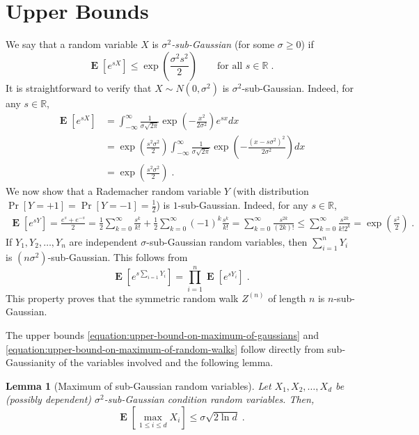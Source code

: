 \documentclass{article}
\DeclareMathOperator*{\Exp}{\mathbf{E}}
\newcommand{\field}[1]{\mathbb{#1}}
\newcommand{\R}{\field{R}}
\newtheorem{lemma}[theorem]{Lemma}
\begin{document}
\section{Upper Bounds}
\label{section:upper-bounds}

We say that a random variable $X$ is \emph{$\sigma^2$-sub-Gaussian} (for some $\sigma \ge 0$) if
\begin{equation}
\label{equation:sigma-sub-gaussian}
\Exp \left[ e^{sX} \right] \le \exp\left( \frac{\sigma^2 s^2}{2} \right) \qquad \text{for all $s \in \R$} \; .
\end{equation}
It is straightforward to verify that $X \sim N(0,\sigma^2)$ is $\sigma^2$-sub-Gaussian. Indeed, for any $s \in \R$,
\begin{align*}
\Exp \left[ e^{sX} \right]
& = \int_{-\infty}^\infty \frac{1}{\sigma \sqrt{2\pi}} \exp\left( - \frac{x^2}{2\sigma^2} \right) e^{sx} dx \\
& = \exp\left( \frac{s^2\sigma^2}{2} \right) \int_{-\infty}^\infty \frac{1}{\sigma \sqrt{2\pi}} \exp\left( - \frac{(x - s\sigma^2)^2}{2\sigma^2} \right) dx \\
& = \exp\left( \frac{s^2\sigma^2}{2} \right) \; .
\end{align*}
We now show that a Rademacher random variable $Y$ (with distribution $\Pr[Y = +1] = \Pr[Y=-1] = \frac{1}{2}$)
is $1$-sub-Gaussian. Indeed, for any $s \in \R$,
\begin{align*}
\Exp \left[ e^{sY} \right]
= \frac{e^{s} + e^{-s}}{2}
= \frac{1}{2}\sum_{k=0}^\infty \frac{s^k}{k!}
+ \frac{1}{2}\sum_{k=0}^\infty (-1)^k \frac{s^k}{k!}
= \sum_{k=0}^\infty \frac{s^{2k}}{(2k)!}
\le \sum_{k=0}^\infty \frac{s^{2k}}{k! 2^k}
= \exp\left( \frac{s^2}{2} \right) \; .
\end{align*}
If $Y_1, Y_2, \dots, Y_n$ are independent $\sigma$-sub-Gaussian random variables, then $\sum_{i=1}^n Y_i$ is $(n\sigma^2)$-sub-Gaussian.
This follows from
$$
\Exp \left[ e^{s \sum_{i=1} Y_i} \right] = \prod_{i=1}^n \Exp \left[ e^{sY_i} \right] \; .
$$
This property proves that the symmetric random walk $Z^{(n)}$ of length $n$ is $n$-sub-Gaussian.

The upper bounds \eqref{equation:upper-bound-on-maximum-of-gaussians} and
\eqref{equation:upper-bound-on-maximum-of-random-walks} follow directly from
sub-Gaussianity of the variables involved and the following lemma.

\begin{lemma}[Maximum of sub-Gaussian random variables]
Let $X_1, X_2, \dots, X_d$ be (possibly dependent) $\sigma^2$-sub-Gaussian condition random variables.
Then,
$$
\Exp\left[ \max_{1 \le i \le d} X_i \right] \le \sigma \sqrt{2 \ln d} \; .
$$
\end{lemma}
\end{document}

